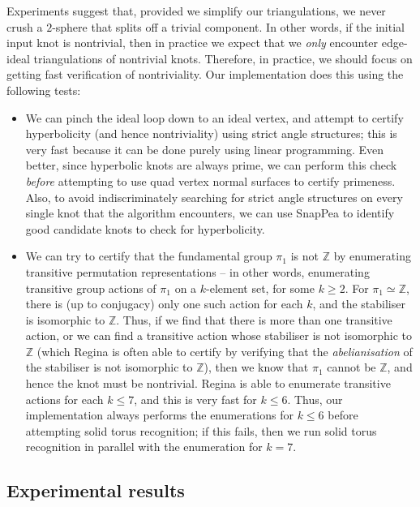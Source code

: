 \documentclass[10pt,a4paper]{amsart}
\begin{document}
Experiments suggest that, provided we simplify our triangulations, we never crush a $2$-sphere that splits off a trivial component.
In other words, if the initial input knot is nontrivial, then in practice we expect that we \emph{only} encounter edge-ideal triangulations of nontrivial knots.
Therefore, in practice, we should focus on getting fast verification of nontriviality.
Our implementation does this using the following tests:
\begin{itemize}
\item
We can pinch the ideal loop down to an ideal vertex, and attempt to certify hyperbolicity (and hence nontriviality) using strict angle structures;
this is very fast because it can be done purely using linear programming.
Even better, since hyperbolic knots are always prime, we can perform this check \emph{before}
attempting to use quad vertex normal surfaces to certify primeness.
Also, to avoid indiscriminately searching for strict angle structures on every single knot that the algorithm encounters,
we can use SnapPea to identify good candidate knots to check for hyperbolicity.
\item
We can try to certify that the fundamental group $\pi_1$ is not $\mathbb{Z}$ by enumerating transitive permutation representations --
in other words, enumerating transitive group actions of $\pi_1$ on a $k$-element set, for some $k \geqslant 2$.
For $\pi_1 \simeq \mathbb{Z}$, there is (up to conjugacy) only one such action for each $k$, and the stabiliser is isomorphic to $\mathbb{Z}$.
Thus, if we find that there is more than one transitive action, or we can find a transitive action whose stabiliser is not isomorphic to $\mathbb{Z}$
(which Regina is often able to certify by verifying that the \emph{abelianisation} of the stabiliser is not isomorphic to $\mathbb{Z}$),
then we know that $\pi_1$ cannot be $\mathbb{Z}$, and hence the knot must be nontrivial.
Regina is able to enumerate transitive actions for each $k \leqslant 7$, and this is very fast for $k \leqslant 6$.
Thus, our implementation always performs the enumerations for $k \leqslant 6$ before attempting solid torus recognition;
if this fails, then we run solid torus recognition in parallel with the enumeration for $k = 7$.
\end{itemize}

\subsection{Experimental results}\label{ssec:experiment}
\end{document}
